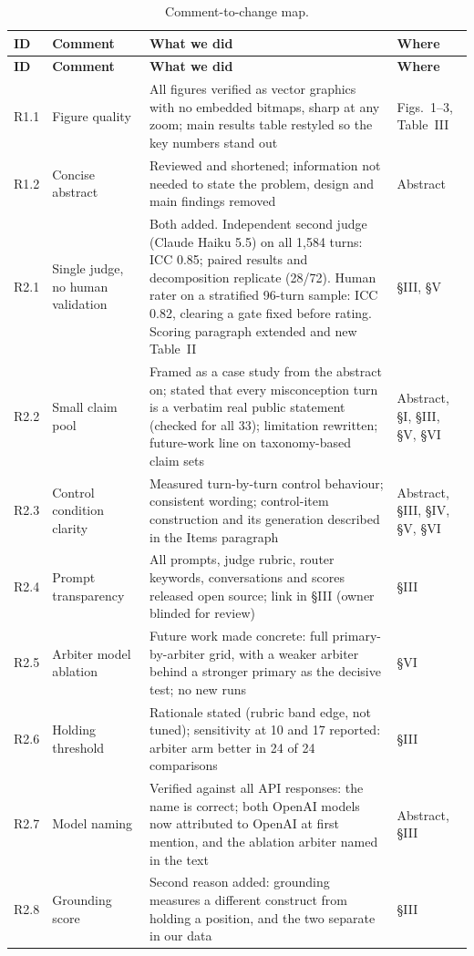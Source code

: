 \documentclass[11pt,a4paper]{article}
\begin{document}
\begin{longtable}{p{0.9cm} p{3.6cm} p{7.4cm} p{2.2cm}}
\caption{Comment-to-change map.\label{tab:summary-changes}}\\
\toprule
\textbf{ID} & \textbf{Comment} & \textbf{What we did} & \textbf{Where} \\
\midrule
\endfirsthead
\toprule
\textbf{ID} & \textbf{Comment} & \textbf{What we did} & \textbf{Where} \\
\midrule
\endhead
R1.1 & Figure quality & All figures verified as vector graphics with no embedded bitmaps, sharp at any zoom; main results table restyled so the key numbers stand out & Figs.~1--3, Table~III \\
R1.2 & Concise abstract & Reviewed and shortened; information not needed to state the problem, design and main findings removed & Abstract \\
R2.1 & Single judge, no human validation & Both added. Independent second judge (Claude Haiku 5.5) on all 1{,}584 turns: ICC 0.85; paired results and decomposition replicate (28/72). Human rater on a stratified 96-turn sample: ICC 0.82, clearing a gate fixed before rating. Scoring paragraph extended and new Table~II & §III, §V \\
R2.2 & Small claim pool & Framed as a case study from the abstract on; stated that every misconception turn is a verbatim real public statement (checked for all 33); limitation rewritten; future-work line on taxonomy-based claim sets & Abstract, §I, §III, §V, §VI \\
R2.3 & Control condition clarity & Measured turn-by-turn control behaviour; consistent wording; control-item construction and its generation described in the Items paragraph & Abstract, §III, §IV, §V, §VI \\
R2.4 & Prompt transparency & All prompts, judge rubric, router keywords, conversations and scores released open source; link in §III (owner blinded for review) & §III \\
R2.5 & Arbiter model ablation & Future work made concrete: full primary-by-arbiter grid, with a weaker arbiter behind a stronger primary as the decisive test; no new runs & §VI \\
R2.6 & Holding threshold & Rationale stated (rubric band edge, not tuned); sensitivity at 10 and 17 reported: arbiter arm better in 24 of 24 comparisons & §III \\
R2.7 & Model naming & Verified against all API responses: the name is correct; both OpenAI models now attributed to OpenAI at first mention, and the ablation arbiter named in the text & Abstract, §III \\
R2.8 & Grounding score & Second reason added: grounding measures a different construct from holding a position, and the two separate in our data & §III \\
\bottomrule
\end{longtable}
\end{document}
